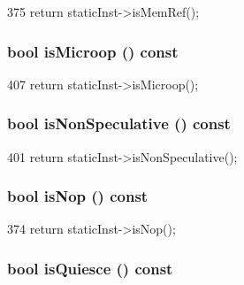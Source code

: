 \begin{DoxyCode}
375 { return staticInst->isMemRef(); }
\end{DoxyCode}
\hypertarget{classInOrderDynInst_a19f74cdac8afa870418c056c72645187}{
\subsubsection[{isMicroop}]{\setlength{\rightskip}{0pt plus 5cm}bool isMicroop () const}}
\label{classInOrderDynInst_a19f74cdac8afa870418c056c72645187}



\begin{DoxyCode}
407 { return staticInst->isMicroop(); }
\end{DoxyCode}
\hypertarget{classInOrderDynInst_af032774c8da8aea2d9d84d5f3f211a7f}{
\subsubsection[{isNonSpeculative}]{\setlength{\rightskip}{0pt plus 5cm}bool isNonSpeculative () const}}
\label{classInOrderDynInst_af032774c8da8aea2d9d84d5f3f211a7f}



\begin{DoxyCode}
401 { return staticInst->isNonSpeculative(); }
\end{DoxyCode}
\hypertarget{classInOrderDynInst_a45dbb9ace4c729e7bb701ce535fb1667}{
\subsubsection[{isNop}]{\setlength{\rightskip}{0pt plus 5cm}bool isNop () const}}
\label{classInOrderDynInst_a45dbb9ace4c729e7bb701ce535fb1667}



\begin{DoxyCode}
374 { return staticInst->isNop(); }
\end{DoxyCode}
\hypertarget{classInOrderDynInst_adc9467e7b34e8dff3964c85b66bb1b93}{
\subsubsection[{isQuiesce}]{\setlength{\rightskip}{0pt plus 5cm}bool isQuiesce () const}}
\label{classInOrderDynInst_adc9467e7b34e8dff3964c85b66bb1b93}




